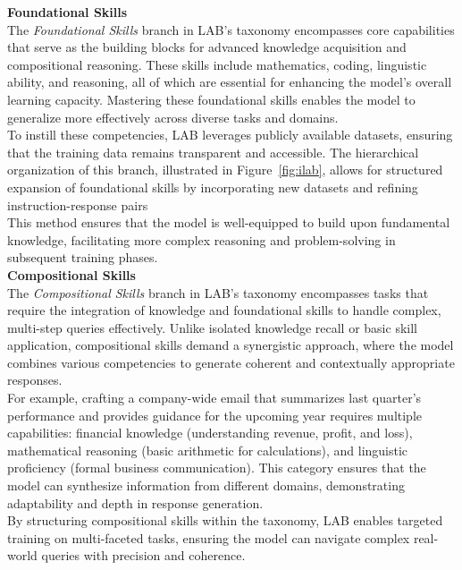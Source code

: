 \documentclass[12pt]{article}
\begin{document}
\textbf{Foundational Skills}\\
The \textit{Foundational Skills} branch in LAB’s taxonomy encompasses core capabilities that serve as the building blocks for advanced knowledge acquisition and compositional reasoning. These skills include mathematics, coding, linguistic ability, and reasoning, all of which are essential for enhancing the model’s overall learning capacity. Mastering these foundational skills enables the model to generalize more effectively across diverse tasks and domains.\vspace{14pt}\\
To instill these competencies, LAB leverages publicly available datasets, ensuring that the training data remains transparent and accessible. The hierarchical organization of this branch, illustrated in Figure~\ref{fig:ilab}, allows for structured expansion of foundational skills by incorporating new datasets and refining instruction-response pairs\\
This method ensures that the model is well-equipped to build upon fundamental knowledge, facilitating more complex reasoning and problem-solving in subsequent training phases.\vspace{14pt}\\
\textbf{Compositional Skills}\\
The \textit{Compositional Skills} branch in LAB’s taxonomy encompasses tasks that require the integration of knowledge and foundational skills to handle complex, multi-step queries effectively. Unlike isolated knowledge recall or basic skill application, compositional skills demand a synergistic approach, where the model combines various competencies to generate coherent and contextually appropriate responses.\vspace{14pt}\\
For example, crafting a company-wide email that summarizes last quarter’s performance and provides guidance for the upcoming year requires multiple capabilities: financial knowledge (understanding revenue, profit, and loss), mathematical reasoning (basic arithmetic for calculations), and linguistic proficiency (formal business communication). This category ensures that the model can synthesize information from different domains, demonstrating adaptability and depth in response generation.\vspace{14pt}\\
By structuring compositional skills within the taxonomy, LAB enables targeted training on multi-faceted tasks, ensuring the model can navigate complex real-world queries with precision and coherence.
\end{document}
